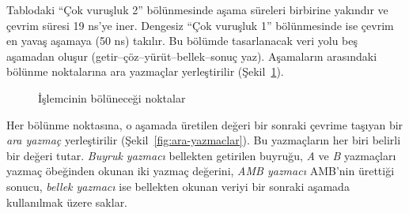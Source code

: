 Tablodaki ``Çok vuruşluk 2'' bölünmesinde aşama süreleri birbirine yakındır ve çevrim süresi 19 ns'ye iner. Dengesiz ``Çok vuruşluk 1'' bölünmesinde ise çevrim en yavaş aşamaya (50 ns) takılır. Bu bölümde tasarlanacak veri yolu beş aşamadan oluşur (getir--çöz--yürüt--bellek--sonuç yaz). Aşamaların arasındaki bölünme noktalarına ara yazmaçlar yerleştirilir (Şekil~\ref{fig:bolunme-noktalari}).

\begin{figure}[htbp]
\centering
{}
\caption{İşlemcinin bölüneceği noktalar}
\label{fig:bolunme-noktalari}
\end{figure}

Her bölünme noktasına, o aşamada üretilen değeri bir sonraki çevrime taşıyan bir \emph{ara yazmaç} yerleştirilir (Şekil~\ref{fig:ara-yazmaclar}). Bu yazmaçların her biri belirli bir değeri tutar. \emph{Buyruk yazmacı} bellekten getirilen buyruğu, \emph{A} ve \emph{B} yazmaçları yazmaç öbeğinden okunan iki yazmaç değerini, \emph{AMB yazmacı} AMB'nin ürettiği sonucu, \emph{bellek yazmacı} ise bellekten okunan veriyi bir sonraki aşamada kullanılmak üzere saklar.

